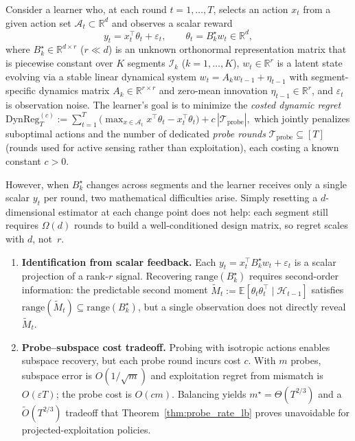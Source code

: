 \documentclass{article}
\newcommand{\R}{\mathbb{R}}
\newcommand{\E}{\mathbb{E}}
\newcommand{\cA}{\mathcal{A}}
\newcommand{\cH}{\mathcal{H}}
\newcommand{\cI}{\mathcal{I}}
\newcommand{\cTprobe}{\mathcal{T}_{\mathrm{probe}}}
\newcommand{\DynReg}{\mathrm{DynReg}}
\newcommand{\range}{\mathrm{range}}
\begin{document}
  Consider a learner who, at each round $t = 1, \ldots, T$, selects
  an action $x_t$ from a given action set $\cA_t \subset \R^d$ and
  observes a scalar reward
  \begin{equation}
  y_t = x_t^\top \theta_t + \varepsilon_t, \qquad
  \theta_t = B_k^\star w_t \in \R^d, \label{eq:intro_model}
  \end{equation}
  where $B_k^\star \in \R^{d \times r}$ ($r \ll d$) is an unknown
  orthonormal representation matrix that is piecewise constant over
  $K$ segments $\cI_k$ ($k = 1, \ldots, K$), $w_t \in \R^r$ is
  a latent state evolving via a stable linear dynamical system
  $w_t = A_k w_{t-1} + \eta_{t-1}$ with segment-specific dynamics
  matrix $A_k \in \R^{r \times r}$ and zero-mean innovation
  $\eta_{t-1} \in \R^r$, and $\varepsilon_t$ is observation noise.
  The learner's goal is to minimize the \emph{costed dynamic regret}
  $\DynReg_T^{(c)} := \sum_{t=1}^T \bigl(\max_{x \in \cA_t}
  x^\top\theta_t - x_t^\top\theta_t\bigr) + c\,|\cTprobe|,$
  which jointly penalizes suboptimal actions and the number of
  dedicated \emph{probe rounds} $\cTprobe \subseteq [T]$
  (rounds used for active sensing rather than exploitation), each
  costing a known constant $c > 0$.

 However, when $B_k^\star$ changes across segments and the learner
receives only a single scalar $y_t$ per round, two mathematical
difficulties arise.
Simply resetting a $d$-dimensional estimator at each change point
does not help: each segment still requires $\Omega(d)$ rounds to
build a well-conditioned design matrix, so regret scales with $d$,
not~$r$.
  \begin{enumerate}[nosep,leftmargin=2em]
  \item \textbf{Identification from scalar feedback.}
  Each $y_t = x_t^\top B_k^\star w_t + \varepsilon_t$ is a scalar projection of a rank-$r$ signal.
  Recovering $\range(B_k^\star)$ requires second-order information: the predictable second moment
  $\widetilde{M}_t := \E[\theta_t\theta_t^\top \mid \cH_{t-1}]$ satisfies
  $\range(\widetilde{M}_t) \subseteq \range(B_k^\star)$, but a single observation does not directly reveal $\widetilde{M}_t$.
  \item \textbf{Probe--subspace cost tradeoff.}
  Probing with isotropic actions enables subspace recovery, but each probe round incurs cost $c$.
  With $m$ probes, subspace error is $O(1/\sqrt{m})$ and exploitation regret from mismatch is $O(\varepsilon T)$; the probe cost is $O(cm)$.
  Balancing yields $m^\star = \Theta(T^{2/3})$ and a $\widetilde{O}(T^{2/3})$ tradeoff that Theorem~\ref{thm:probe_rate_lb} proves unavoidable for projected-exploitation policies.
  \end{enumerate}
\end{document}
